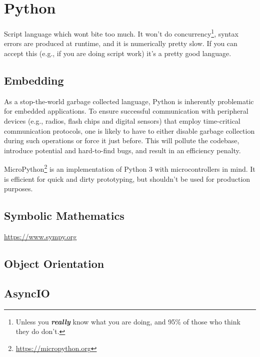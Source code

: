 \section{Python}

Script language which wont bite too much. It won't do concurrency\footnote{Unless you \textsl{\textbf{really}} know what you are doing, and 95\% of those who think they do don't.}, syntax errors are produced at runtime, and it is numerically pretty slow. If you can accept this (e.g., if you are doing script work) it's a pretty good language.

\subsection{Embedding}

As a stop-the-world garbage collected language, Python is inherently problematic for embedded applications. To ensure successful communication with peripheral devices (e.g., radios, flash chips and digital sensors) that employ time-critical communication protocols, one is likely to have to either disable garbage collection during such operations or force it just before. This will pollute the codebase, introduce potential and hard-to-find bugs, and result in an efficiency penalty.

MicroPython\footnote{\url{https://micropython.org}} is an implementation of Python 3 with microcontrollers in mind. It is efficient for quick and dirty prototyping, but shouldn't be used for production purposes.

\subsection{Symbolic Mathematics}

\url{https://www.sympy.org}

\subsection{Object Orientation}

\subsection{AsyncIO}

